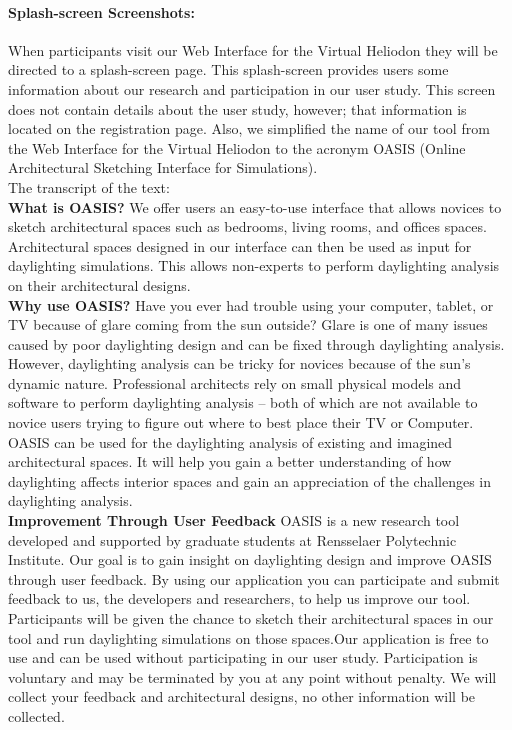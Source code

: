 \documentclass[12pt]{article}
\begin{document}

\newpage
\paragraph{Splash-screen Screenshots:}
When participants visit our Web Interface for the Virtual Heliodon they will be directed to a splash-screen page. 
This splash-screen provides users some information about our research and participation in our user study. This screen does not contain details about the user study, however; that information is located on the registration page. Also, we simplified the name of our tool from the Web Interface for the Virtual Heliodon to the acronym OASIS (Online Architectural Sketching Interface for Simulations).\\

\noindent The transcript of the text:\\

\textbf{What is OASIS?}
We offer users an easy-to-use interface that allows novices to sketch architectural spaces such as bedrooms, living rooms, and offices spaces. Architectural spaces designed in our interface can then be used as input for daylighting simulations. This allows non-experts to perform daylighting analysis on their architectural designs.\\ 

\textbf{Why use OASIS?}
Have you ever had trouble using your computer, tablet, or TV because of glare coming from the sun outside? Glare is one of many issues caused by poor daylighting design and can be fixed through daylighting analysis. However, daylighting analysis can be tricky for novices because of the sun's dynamic nature. Professional architects rely on small physical models and software to perform daylighting analysis -- both of which are not available to novice users trying to figure out where to best place their TV or Computer. OASIS can be used for the daylighting analysis of existing and imagined architectural spaces. It will help you gain a better understanding of how daylighting affects interior spaces and gain an appreciation of the challenges in daylighting analysis.\\

\textbf{Improvement Through User Feedback}
OASIS is a new research tool developed and supported by graduate students at Rensselaer Polytechnic Institute. Our goal is to gain insight on daylighting design and improve OASIS through user feedback. By using our application you can participate and submit feedback to us, the developers and researchers, to help us improve our tool. Participants will be given the chance to sketch their architectural spaces in our tool and run daylighting simulations on those spaces.Our application is free to use and can be used without participating in our user study. Participation is voluntary and may be terminated by you at any point without penalty. We will collect your feedback and architectural designs, no other information will be collected. \\
\end{document}
